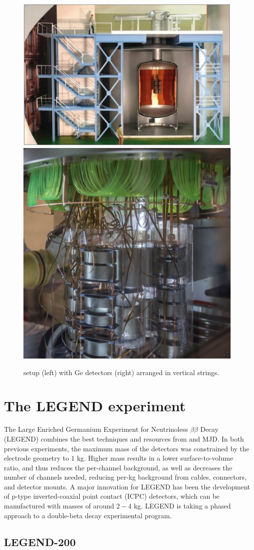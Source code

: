 \begin{figure}
\centering
\includegraphics[height=0.385\columnwidth]{ch2/figs/gerda_setup.pdf}
\qquad
\includegraphics[height=0.385\columnwidth]{ch2/figs/gerdastrings.pdf}
\caption{{\Gerda} setup (left) with Ge detectors (right) arranged in vertical strings.}
\label{ch2_fig_gerda_setup}
\end{figure}
  
\section{The LEGEND experiment}
The Large Enriched Germanium Experiment for Neutrinoless $\beta\beta$ Decay (LEGEND) combines the best techniques and resources from {\Gerda} and MJD. In both previous experiments, the maximum mass of the detectors was constrained by the electrode geometry to $1$ kg. Higher mass results in a lower surface-to-volume ratio, and thus reduces the per-channel background, as well as decreases the number of channels needed, reducing per-kg background from cables, connectors, and detector mounts. A major innovation for LEGEND has been the development of p-type inverted-coaxial point contact (ICPC) detectors, which can be manufactured with masses of around $2-4$ kg. LEGEND is taking a phased approach to a double-beta decay experimental program.

\subsection{LEGEND-200}

